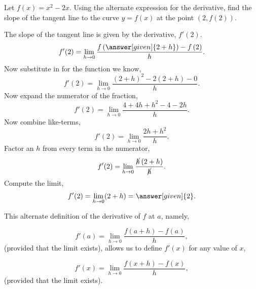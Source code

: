 \documentclass{ximera}
\begin{document}
\begin{example}
 Let $f(x) = x^2-2x$. Using the alternate expression for the derivative, find the slope of the tangent line to the curve $y=f(x)$ at the point $(2,f(2))$.
  \begin{explanation}
   The slope of the tangent line is given by the derivative, $f'(2)$.
    \[
    f'(2) =  \lim_{h\to 0}\frac{f\left(\answer[given]{2+h}\right)-f\left(2\right)}{h}.
    \]
    Now substitute in for the function we know,
    \[
    f'(2) = \lim_{h\to 0}\frac{(2+h)^2-2(2+h) -0}{h}.
    \]
    Now expand the numerator of the fraction,
    \[
     f'(2) =\lim_{h\to 0}  \frac{4+4h+h^2-4-2h }{h}.
    \]
    Now combine like-terms,
    \[
    f'(2) = \lim_{h\to 0} \frac{2h+h^2}{h}.
    \]
    Factor an $h$ from every term in the numerator,
    \[
   f'(2) =  \lim_{h\to 0}\frac{\cancel{h}\left(2+h\right)}{\cancel{h}}.
    \]
  Compute the limit,
    \[
     f'(2) =  \lim_{h\to 0}(2+h)=\answer[given]{2}. 
    \]
  \end{explanation}
\end{example}


	
This alternate definition of the derivative of $f$ at $a$, namely,


\[
f'(a) = \lim_{h\to 0}\frac{f(a+h)-f(a)}{h},
\]
(provided that the limit exists), allows us to define $f'(x)$ 
 for any value of $x$, 

\[
f'(x) = \lim_{h\to 0}\frac{f(x+h)-f(x)}{h},
\]
(provided that the limit exists).
\end{document}
